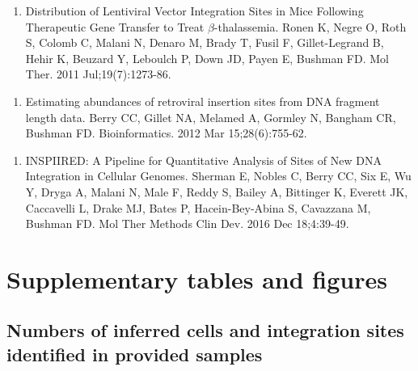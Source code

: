 \documentclass[12pt,]{article}
\providecommand{\tightlist}{%
  \setlength{\itemsep}{0pt}\setlength{\parskip}{0pt}}
\begin{document}
\vspace{0.1cm}

\begin{enumerate}
\def\labelenumi{\arabic{enumi}.}
\setcounter{enumi}{2}
\tightlist
\item
  Distribution of Lentiviral Vector Integration Sites in Mice Following
  Therapeutic Gene Transfer to Treat \(\beta\)-thalassemia. Ronen K,
  Negre O, Roth S, Colomb C, Malani N, Denaro M, Brady T, Fusil F,
  Gillet-Legrand B, Hehir K, Beuzard Y, Leboulch P, Down JD, Payen E,
  Bushman FD. Mol Ther. 2011 Jul;19(7):1273-86.
\end{enumerate}

\vspace{0.1cm}

\begin{enumerate}
\def\labelenumi{\arabic{enumi}.}
\setcounter{enumi}{3}
\tightlist
\item
  Estimating abundances of retroviral insertion sites from DNA fragment
  length data. Berry CC, Gillet NA, Melamed A, Gormley N, Bangham CR,
  Bushman FD. Bioinformatics. 2012 Mar 15;28(6):755-62.
\end{enumerate}

\vspace{0.1cm}

\begin{enumerate}
\def\labelenumi{\arabic{enumi}.}
\setcounter{enumi}{4}
\tightlist
\item
  INSPIIRED: A Pipeline for Quantitative Analysis of Sites of New DNA
  Integration in Cellular Genomes. Sherman E, Nobles C, Berry CC, Six E,
  Wu Y, Dryga A, Malani N, Male F, Reddy S, Bailey A, Bittinger K,
  Everett JK, Caccavelli L, Drake MJ, Bates P, Hacein-Bey-Abina S,
  Cavazzana M, Bushman FD. Mol Ther Methods Clin Dev. 2016 Dec
  18;4:39-49.
\end{enumerate}

\newpage

\section{Supplementary tables and
figures}\label{supplementary-tables-and-figures}

\subsection{Numbers of inferred cells and integration sites identified
in provided
samples}\label{numbers-of-inferred-cells-and-integration-sites-identified-in-provided-samples}
\end{document}
